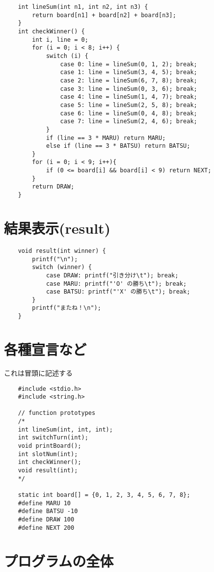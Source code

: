 \documentclass[uplatex,a4paper,11pt,oneside,openany]{jsarticle}
\begin{document}
\begin{lstlisting}
	int lineSum(int n1, int n2, int n3) {
		return board[n1] + board[n2] + board[n3];
	}
	int checkWinner() {
		int i, line = 0;
		for (i = 0; i < 8; i++) {
			switch (i) {
				case 0: line = lineSum(0, 1, 2); break;
				case 1: line = lineSum(3, 4, 5); break;
				case 2: line = lineSum(6, 7, 8); break;
				case 3: line = lineSum(0, 3, 6); break;
				case 4: line = lineSum(1, 4, 7); break;
				case 5: line = lineSum(2, 5, 8); break;
				case 6: line = lineSum(0, 4, 8); break;
				case 7: line = lineSum(2, 4, 6); break;
			}
			if (line == 3 * MARU) return MARU;
			else if (line == 3 * BATSU) return BATSU;
		}
		for (i = 0; i < 9; i++){
			if (0 <= board[i] && board[i] < 9) return NEXT;
		}
		return DRAW;
	}
\end{lstlisting}

\newpage

\section{結果表示(result)}

\begin{lstlisting}
	void result(int winner) {
		printf("\n");
		switch (winner) {
			case DRAW: printf("引き分け\t"); break;
			case MARU: printf("'O' の勝ち\t"); break;
			case BATSU: printf("'X' の勝ち\t"); break;
		}
		printf("またね！\n");
	}
\end{lstlisting}

\section{各種宣言など}

これは冒頭に記述する

\begin{lstlisting}
	#include <stdio.h>
	#include <string.h>
	
	// function prototypes
	/*
	int lineSum(int, int, int);
	int switchTurn(int);
	void printBoard();
	int slotNum(int);
	int checkWinner();
	void result(int);
	*/
	
	static int board[] = {0, 1, 2, 3, 4, 5, 6, 7, 8};
	#define MARU 10
	#define BATSU -10
	#define DRAW 100
	#define NEXT 200
\end{lstlisting}

\newpage

\section{プログラムの全体}


\end{document}
